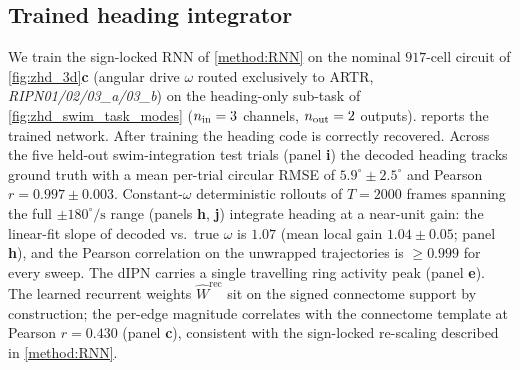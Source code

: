 \documentclass[11pt]{article}
\begin{document}
\subsection{Trained heading integrator}
\label{sec:results_evolution}

We train the sign-locked RNN of \cref{method:RNN} on the nominal
$917$-cell circuit of \cref{fig:zhd_3d}\textbf{c} (angular drive
$\omega$ routed exclusively to ARTR, \emph{RIPN01/02/03\_a/03\_b})
on the
heading-only sub-task of \cref{fig:zhd_swim_task_modes} ($n_{\rm in}=3$
channels, $n_{\rm out}=2$ outputs).
 reports the trained network.
After training the heading code is correctly recovered. Across the
five held-out swim-integration test trials (panel \textbf{i}) the
decoded heading tracks ground truth with a mean per-trial circular
RMSE of $5.9^\circ \pm 2.5^\circ$ and Pearson $r=0.997 \pm 0.003$.
Constant-$\omega$ deterministic rollouts of $T=2000$ frames spanning
the full $\pm 180^\circ/\mathrm{s}$ range (panels \textbf{h},
\textbf{j}) integrate heading at a near-unit gain: the linear-fit slope
of decoded vs.\ true $\omega$ is $1.07$ (mean local gain
$1.04 \pm 0.05$; panel \textbf{h}), and the Pearson correlation on the
unwrapped trajectories is $\ge 0.999$ for every
sweep. The dIPN carries a single travelling
ring activity peak (panel \textbf{e}). The learned recurrent weights
$\hat W^{\mathrm{rec}}$ sit on the signed connectome support by
construction; the per-edge magnitude correlates with the connectome
template at Pearson $r=0.430$ (panel \textbf{c}), consistent with the
sign-locked re-scaling described in \cref{method:RNN}.
\end{document}
